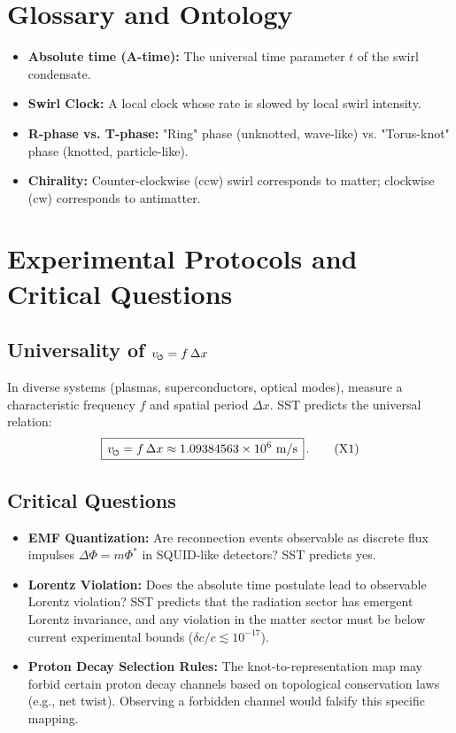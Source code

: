 \documentclass[11pt]{article}
\newcommand{\swirlarrow}{%
    \mathchoice{\mkern-2mu\scriptstyle\boldsymbol{\circlearrowleft}}%
    {\mkern-2mu\scriptstyle\boldsymbol{\circlearrowleft}}%
    {\mkern-2mu\scriptscriptstyle\boldsymbol{\circlearrowleft}}%
    {\mkern-2mu\scriptscriptstyle\boldsymbol{\circlearrowleft}}%
}
\newcommand{\vscore}{v_{\swirlarrow}}                    %
\begin{document}
    \appendix

\section{Glossary and Ontology}
\begin{itemize}
\item \textbf{Absolute time (A-time):} The universal time parameter $t$ of the swirl condensate.
\item \textbf{Swirl Clock:} A local clock whose rate is slowed by local swirl intensity.
\item \textbf{R-phase vs. T-phase:} "Ring" phase (unknotted, wave-like) vs. "Torus-knot" phase (knotted, particle-like).
\item \textbf{Chirality:} Counter-clockwise (ccw) swirl corresponds to matter; clockwise (cw) corresponds to antimatter.
\end{itemize}

\section{Experimental Protocols and Critical Questions}
\subsection*{Universality of $\vscore = f\,\Delta x$}
    In diverse systems (plasmas, superconductors, optical modes), measure a characteristic frequency $f$ and spatial period $\Delta x$. SST predicts the universal relation:
    \begin{equation}
    \boxed{\,\vscore = f\,\Delta x \approx 1.09384563\times10^{6}\ \mathrm{m/s}\,}\,. \tag{X1}
    \end{equation}

\subsection*{Critical Questions}
    \begin{itemize}
    \item \textbf{EMF Quantization:} Are reconnection events observable as discrete flux impulses $\Delta\Phi = m \Phi^*$ in SQUID-like detectors? SST predicts yes.
    \item \textbf{Lorentz Violation:} Does the absolute time postulate lead to observable Lorentz violation? SST predicts that the radiation sector has emergent Lorentz invariance, and any violation in the matter sector must be below current experimental bounds ($\delta c/c \lesssim 10^{-17}$).
    \item \textbf{Proton Decay Selection Rules:} The knot-to-representation map may forbid certain proton decay channels based on topological conservation laws (e.g., net twist). Observing a forbidden channel would falsify this specific mapping.
    \end{itemize}
\end{document}
